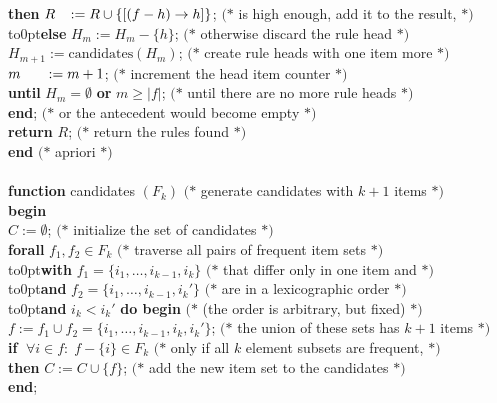 \documentclass{article}
\def\lftbox#1#2{\hbox to0pt{#2\hss}\phantom{#1}}
\begin{document}
\begin{tabbing}
\> \> \> \> {\bf then} $\lftbox{H_m}{$R$}
                       := R \cup \{ [(f-h) \to h] \}$;
   \>         $(*$ is high enough, add it to the result, $*)$ \\
\> \> \> \> \lftbox{\bf then}{\bf else} $H_m := H_m - \{h\}$;
   \>         $(*$ otherwise discard the rule head $*)$ \\
\> \> \> $H_{m+1} := \mbox{candidates}(H_m)$;
   \>\>       $(*$ create rule heads with one item more $*)$ \\
\> \> \> $\lftbox{H_{m+1}}{$m$} := m+1$;
   \>\>       $(*$ increment the head item counter $*)$ \\
\> \> {\bf until} $H_m = \emptyset$ {\bf or} $m \ge |f|$;
   \>\>\>     $(*$ until there are no more rule heads $*)$ \\
\> {\bf end};
   \>\>\>\>   $(*$ or the antecedent would become empty $*)$ \\
\> {\bf return} $R$;
   \>\>\>\>   $(*$ return the rules found $*)$ \\
{\bf end} $(*$ apriori $*)$ \\
\\
{\bf function} candidates $(F_k)$
   \>\>\>\>\> $(*$ generate candidates with $k+1$ items $*)$\\
{\bf begin} \\
\> $C := \emptyset$;
   \>\>\>\>   $(*$ initialize the set of candidates $*)$ \\
\> {\bf forall} $f_1, f_2 \in F_k$
   \>\>\>\>   $(*$ traverse all pairs of frequent item sets $*)$ \\
\> \lftbox{\bf forall}{\bf with} $f_1 = \{i_1,\ldots,i_{k-1},i_k\}$
   \>\>\>\>   $(*$ that differ only in one item and $*)$ \\
\> \lftbox{\bf forall}{\bf and}  $f_2 = \{i_1,\ldots,i_{k-1},i_k'\}$
   \>\>\>\>   $(*$ are in a lexicographic order $*)$ \\
\> \lftbox{\bf forall}{\bf and}  $i_k < i_k'$ {\bf do begin}
   \>\>\>\>   $(*$ (the order is arbitrary, but fixed) $*)$ \\
\> \> $f := f_1 \cup f_2 = \{i_1,\ldots,i_{k-1},i_k,i_k'\}$;
   \>\>\>     $(*$ the union of these sets has $k+1$ items $*)$ \\
\> \> {\bf if} $\;\forall i \in f:\; f -\{i\} \in F_k$
   \>\>\>     $(*$ only if all $k$ element subsets are frequent, $*)$ \\
\> \> {\bf then} $C := C \cup \{f\}$;
   \>\>\>     $(*$ add the new item set to the candidates $*)$ \\
\> {\bf end};

\end{tabbing}
\end{document}
